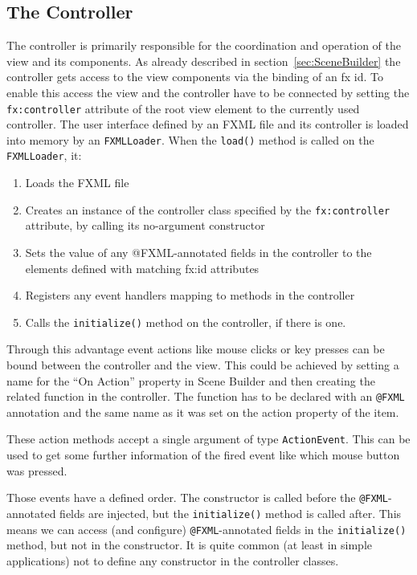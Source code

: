 \subsection{The Controller}
The controller is primarily responsible for the coordination and operation of the view and its components. As already described in section~\ref{sec:SceneBuilder} the controller gets access to the view components via the binding of an fx id. To enable this access the view and the controller have to be connected by setting the \lstinline$fx:controller$ attribute of the root view element to the currently used controller. The user interface defined by an FXML file and its controller is loaded into memory by an \lstinline$FXMLLoader$. When the \lstinline$load()$ method is called on the \lstinline$FXMLLoader$, it:
\begin{enumerate}
\item Loads the FXML file
\item Creates an instance of the controller class specified by the \lstinline$fx:controller$ attribute, by calling its no-argument constructor
\item Sets the value of any @FXML-annotated fields in the controller to the elements defined with matching fx:id attributes
\item Registers any event handlers mapping to methods in the controller
\item Calls the \lstinline$initialize()$ method on the controller, if there is one.
\end{enumerate}

Through this advantage event actions like mouse clicks or key presses can be bound between the controller and the view. This could be achieved by setting a name for the ``On Action'' property in Scene Builder and then creating the related function in the controller. The function has to be declared with an \lstinline$@FXML$ annotation and the same name as it was set on the action property of the item.

These action methods accept a single argument of type \lstinline$ActionEvent$. This can be used to get some further information of the fired event like which mouse button was pressed.

Those events have a defined order. The constructor is called before the \lstinline$@FXML$-annotated fields are injected, but the \lstinline$initialize()$ method is called after. This means we can access (and configure) \lstinline$@FXML$-annotated fields in the \lstinline$initialize()$ method, but not in the constructor. It is quite common (at least in simple applications) not to define any constructor in the controller classes.

